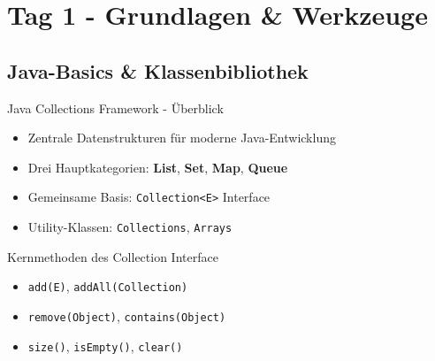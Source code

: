 \section{Tag 1 - Grundlagen \& Werkzeuge}


\subsection{Java-Basics \& Klassenbibliothek}

\begin{frame}{Java Collections Framework - Überblick}
  \begin{itemize}
    \item Zentrale Datenstrukturen für moderne Java-Entwicklung
    \item Drei Hauptkategorien: \textbf{List}, \textbf{Set}, \textbf{Map}, \textbf{Queue}
    \item Gemeinsame Basis: \texttt{Collection<E>} Interface
    \item Utility-Klassen: \texttt{Collections}, \texttt{Arrays}
  \end{itemize}

  \begin{exampleblock}{Kernmethoden des Collection Interface}
    \begin{itemize}
      \item \texttt{add(E)}, \texttt{addAll(Collection)}
      \item \texttt{remove(Object)}, \texttt{contains(Object)}
      \item \texttt{size()}, \texttt{isEmpty()}, \texttt{clear()}
    \end{itemize}
  \end{exampleblock}
\end{frame}

